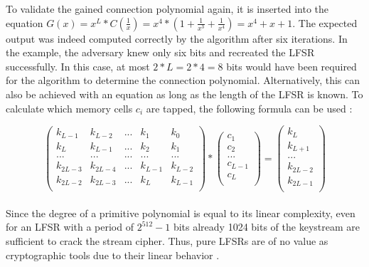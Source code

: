 To validate the gained connection polynomial again, it is inserted into the equation $G(x) = x^L * C(\frac{1}{x}) = x^4 * (1 + \frac{1}{x^3} + \frac{1}{x^4}) = x^4 + x + 1$. The expected output was indeed computed correctly by the algorithm after six iterations. In the example, the adversary knew only six bits and recreated the LFSR successfully. In this case, at most $2*L=2*4=8$ bits would have been required for the algorithm to determine the connection polynomial. Alternatively, this can also be achieved with an equation as long as the length of the LFSR is known. To calculate which memory cells $c_i$ are tapped, the following formula can be used \cite[p. 232]{Smart.2016}:

\[
	\begin{pmatrix}
		k_{L-1} & k_{L-2} & ... & k_1 & k_0 \\
		k_L & k_{L-1} & ... & k_2 & k_1 \\
		... & ... & ... & ... & ... \\
		k_{2L-3} & k_{2L-4} & ... & k_{L-1} & k_{L-2} \\
		k_{2L-2} & k_{2L-3} & ... & k_L & k_{L-1} \\
	\end{pmatrix} *
	\begin{pmatrix}
		c_1 \\
		c_2 \\
		... \\
		c_{L-1} \\
		c_{L} \\
	\end{pmatrix} =
	\begin{pmatrix}
		k_{L} \\
		k_{L+1} \\
		... \\
		k_{2L-2} \\
		k_{2L-1} \\
	\end{pmatrix}
\]\\

Since the degree of a primitive polynomial is equal to its linear complexity, even for an LFSR with a period of $2^{512}-1$ bits already 1024 bits of the keystream are sufficient to crack the stream cipher. Thus, pure LFSRs are of no value as cryptographic tools due to their linear behavior \cite[p. 231]{Smart.2016}.